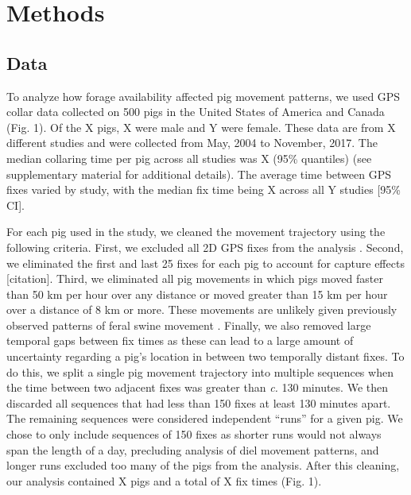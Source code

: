 \documentclass[a4paper]{article}
\begin{document}

\section*{Methods}

\subsection*{Data}

To analyze how forage availability affected pig movement patterns, we used GPS collar data collected on 500 pigs in the United States of America and Canada (Fig. 1).  Of the X pigs, X were male and Y were female. These data are from X different studies and were collected from May, 2004 to November, 2017.  The median collaring time per pig across all studies was X (95\% quantiles) (see supplementary material for additional details). The average time between GPS fixes varied by study, with the median fix time being X across all Y studies [95\% CI]. 

For each pig used in the study, we cleaned the movement trajectory using the following criteria. First, we excluded all 2D GPS fixes from the analysis \citep{Bjorneraas2010}.  Second, we eliminated the first and last 25 fixes for each pig to account for capture effects [citation]. Third, we eliminated all pig movements in which pigs moved faster than 50 km per hour over any distance or moved greater than 15 km per hour over a distance of 8 km or more. These movements are unlikely given previously observed patterns of feral swine movement \citep{Mayer2009}. Finally, we also removed large temporal gaps between fix times as these can lead to a large amount of uncertainty regarding a pig's location in between two temporally distant fixes. To do this, we split a single pig movement trajectory into multiple sequences when the time between two adjacent fixes was greater than \emph{c.} 130 minutes. We then discarded all sequences that had less than 150 fixes at least 130 minutes apart. The remaining sequences were considered independent ``runs'' for a given pig. We chose to only include sequences of 150 fixes as shorter runs would not always span the length of a day, precluding analysis of diel movement patterns, and longer runs excluded too many of the pigs from the analysis. After this cleaning, our analysis contained X pigs and a total of X fix times (Fig. 1).
\end{document}
